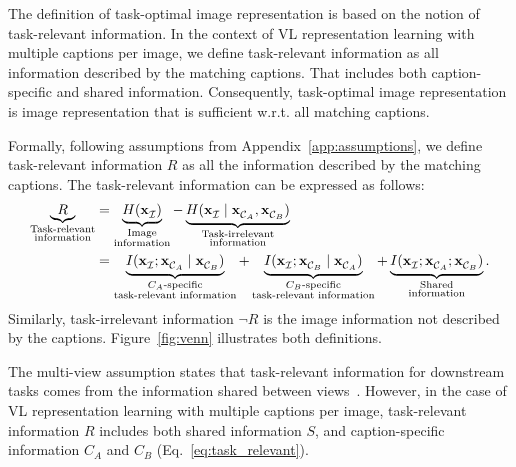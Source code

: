  The definition of task-optimal image representation is based on the notion of task-relevant information. 
In the context of \ac{VL} representation learning with multiple captions per image, we define task-relevant information as all information described by the matching captions. That includes both caption-specific and shared information.
Consequently, task-optimal image representation is image representation that is sufficient w.r.t. all matching captions.

Formally, following assumptions from Appendix~\ref{app:assumptions}, we define task-relevant information $R$ as all the information described by the matching captions. The task-relevant information can be expressed as follows:
%
\begin{equation}
\begin{split}
	\underbrace{R}_{\substack{\text{Task-relevant}\\ \text{information}}} & =
	\underbrace{H(\mathbf{x}_{\mathcal{I}}^{}{} )}_{\substack{\text{Image}\\ \text{information}}}
	- \underbrace{H(\mathbf{x}_{\mathcal{I}}^{}{} \mid \mathbf{x}_{\mathcal{C}_{A}}^{} , \mathbf{x}_{\mathcal{C}_{B}}^{})}_{\substack{\text{Task-irrelevant}\\ \text{information}}}
	\\
	& = 
	\underbrace{I( \mathbf{x}_{\mathcal{I}}^{}{} ; \mathbf{x}_{\mathcal{C}_{A}}^{} \mid \mathbf{x}_{\mathcal{C}_{B}}^{})}_{\substack{\text{$C_{A}$-specific}\\ \text{task-relevant information}}}
	+
	\underbrace{I( \mathbf{x}_{\mathcal{I}}^{}{} ; \mathbf{x}_{\mathcal{C}_{B}}^{} \mid \mathbf{x}_{\mathcal{C}_{A}}^{})}_{\substack{\text{$C_{B}$-specific}\\ \text{task-relevant information}}}
	+
	\underbrace{I(\mathbf{x}_{\mathcal{I}}^{}{} ; \mathbf{x}_{\mathcal{C}_{A}}^{};\mathbf{x}_{\mathcal{C}_{B}}^{})}_{\substack{\text{Shared}\\ \text{information}}}.
\end{split}	
	\label{eq:task_relevant}
\end{equation}
%
Similarly, task-irrelevant information $\neg R$ is the image information not described by the captions. Figure~\ref{fig:venn} illustrates both definitions.

The multi-view assumption states that task-relevant information for downstream tasks comes from the information shared between views~\citep{shwartz2023compress}.  
However, in the case of \ac{VL} representation learning with multiple captions per image, task-relevant information $R$ includes both shared information $S$, and caption-specific information $C_A$ and $C_B$ (Eq.~\ref{eq:task_relevant}).


